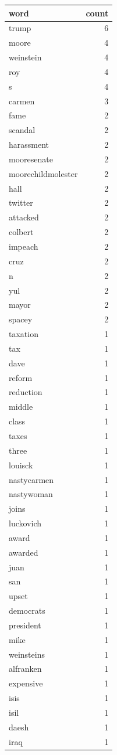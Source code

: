 \begin{tabular}{lr}
\toprule
word & count \\
\midrule
trump & 6 \\
moore & 4 \\
weinstein & 4 \\
roy & 4 \\
s & 4 \\
carmen & 3 \\
fame & 2 \\
scandal & 2 \\
harassment & 2 \\
mooresenate & 2 \\
moorechildmolester & 2 \\
hall & 2 \\
twitter & 2 \\
attacked & 2 \\
colbert & 2 \\
impeach & 2 \\
cruz & 2 \\
n & 2 \\
yul & 2 \\
mayor & 2 \\
spacey & 2 \\
taxation & 1 \\
tax & 1 \\
dave & 1 \\
reform & 1 \\
reduction & 1 \\
middle & 1 \\
class & 1 \\
taxes & 1 \\
three & 1 \\
louisck & 1 \\
nastycarmen & 1 \\
nastywoman & 1 \\
joins & 1 \\
luckovich & 1 \\
award & 1 \\
awarded & 1 \\
juan & 1 \\
san & 1 \\
upset & 1 \\
democrats & 1 \\
president & 1 \\
mike & 1 \\
weinsteins & 1 \\
alfranken & 1 \\
expensive & 1 \\
isis & 1 \\
isil & 1 \\
daesh & 1 \\
iraq & 1 \\
\bottomrule
\end{tabular}

